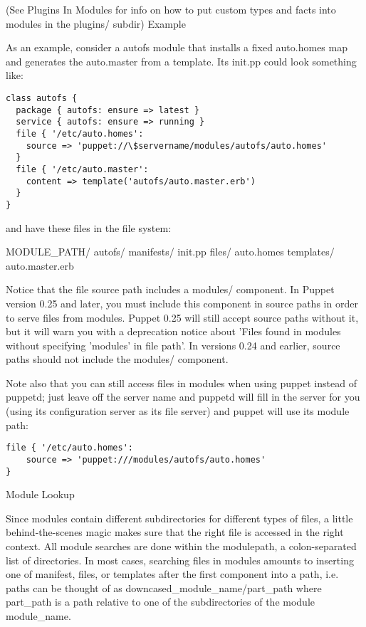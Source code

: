 (See Plugins In Modules for info on how to put custom types and facts into modules in the plugins/ subdir)
Example

As an example, consider a autofs module that installs a fixed auto.homes map and generates the auto.master from a template. Its init.pp could look something like:
%
\begin{code}
\begin{lstlisting}
class autofs {
  package { autofs: ensure => latest }
  service { autofs: ensure => running }
  file { '/etc/auto.homes':
    source => 'puppet://\$servername/modules/autofs/auto.homes'
  }
  file { '/etc/auto.master':
    content => template('autofs/auto.master.erb')
  }
}
\end{lstlisting}
\end{code}
%
and have these files in the file system:

MODULE\_PATH/
  autofs/
    manifests/
      init.pp
    files/
      auto.homes
    templates/
      auto.master.erb

Notice that the file source path includes a modules/ component. In Puppet version 0.25 and later, you must include this component in source paths in order to serve files from modules. Puppet 0.25 will still accept source paths without it, but it will warn you with a deprecation notice about 'Files found in modules without specifying 'modules' in file path'. In versions 0.24 and earlier, source paths should not include the modules/ component.

Note also that you can still access files in modules when using puppet instead of puppetd; just leave off the server name and puppetd will fill in the server for you (using its configuration server as its file server) and puppet will use its module path:
%
\begin{code}
\begin{lstlisting}
file { '/etc/auto.homes':
    source => 'puppet:///modules/autofs/auto.homes'
}
\end{lstlisting}
\end{code}
%
Module Lookup

Since modules contain different subdirectories for different types of files, a little behind-the-scenes magic makes sure that the right file is accessed in the right context. All module searches are done within the modulepath, a colon-separated list of directories. In most cases, searching files in modules amounts to inserting one of manifest, files, or templates after the first component into a path, i.e. paths can be thought of as downcased\_module\_name/part\_path where part\_path is a path relative to one of the subdirectories of the module module\_name.

